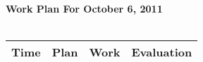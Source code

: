 \documentclass{article}
\begin{document}
\begin{table}[ht!]

{\Huge \bf Work Plan For October 6, 2011}
{\Huge \bf \FilledWeakRainCloud\,}\\
\phantom{stuff} \\

\centering
\begin{tabular}{|l|l|l|l|}
\hline

{\bf \phantom{xxx}Time\phantom{xxx}}
 & {\bf \phantom{xxxxxxxxxxxx}Plan\phantom{xxxxxxxxxxxx}}
 & {\bf \phantom{xxxxxxxxxxxx}Work\phantom{xxxxxxxxxxxx}}
 & {\bf \phantom{xxx}Evaluation\phantom{xxx}}
 \\
\hline




\end{tabular}
\end{table}
\end{document}
